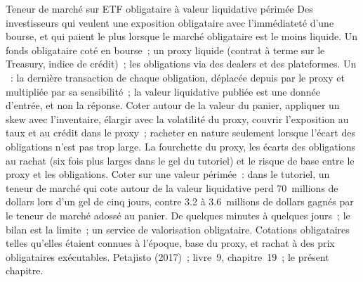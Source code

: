 \begin{strategyfile}{Teneur de marché sur ETF obligataire à valeur liquidative périmée}\label{strat:hf:etf-market-making:bond}
 Des investisseurs qui veulent une exposition obligataire avec l'immédiateté d'une bourse, et qui paient le plus lorsque le marché obligataire est le moins liquide.
 Un fonds obligataire coté en bourse~; un proxy liquide (contrat à terme sur le Treasury, indice de crédit)~; les obligations via des dealers et des plateformes.
 Un ~: la dernière transaction de chaque obligation, déplacée depuis par le proxy et multipliée par sa sensibilité~; la valeur liquidative publiée est une donnée d'entrée,
et non la réponse.
 Coter autour de la valeur du panier, appliquer un skew avec l'inventaire, élargir avec la volatilité du proxy, couvrir l'exposition au taux et au crédit
dans le proxy~; racheter en nature seulement lorsque l'écart des obligations n'est pas trop large.
 La fourchette du proxy, les écarts des obligations au rachat (six fois plus larges dans le gel du tutoriel) et le risque de base entre le proxy et
les obligations.
 Coter sur une valeur périmée~: dans le tutoriel, un teneur de marché qui cote autour de la valeur liquidative perd 70~millions de dollars lors d'un gel de cinq jours, contre
3.2 à 3.6~millions de dollars gagnés par le teneur de marché adossé au panier.
 De quelques minutes à quelques jours~; le bilan est la limite~; un service de valorisation obligataire.
 Cotations obligataires telles qu'elles étaient connues à l'époque, base du proxy, et rachat à des prix obligataires exécutables.
 Petajisto (2017)~; livre~9, chapitre~19~; le présent chapitre.
\end{strategyfile}

